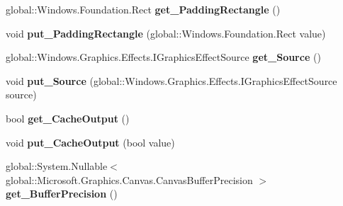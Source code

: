 \begin{DoxyCompactItemize}
global\+::\+Windows.\+Foundation.\+Rect {\bfseries get\+\_\+\+Padding\+Rectangle} ()
\item 
\mbox{\label{class_microsoft_1_1_graphics_1_1_canvas_1_1_effects_1_1_atlas_effect_ab39b71d277811975989494c96fa44eb8}} 
void {\bfseries put\+\_\+\+Padding\+Rectangle} (global\+::\+Windows.\+Foundation.\+Rect value)
\item 
\mbox{\label{class_microsoft_1_1_graphics_1_1_canvas_1_1_effects_1_1_atlas_effect_a137fc0dfdd8f3bd7fa836c902912ad7b}} 
global\+::\+Windows.\+Graphics.\+Effects.\+I\+Graphics\+Effect\+Source {\bfseries get\+\_\+\+Source} ()
\item 
\mbox{\label{class_microsoft_1_1_graphics_1_1_canvas_1_1_effects_1_1_atlas_effect_a5f26925a5df1c7cc2cebea7c7f995d8d}} 
void {\bfseries put\+\_\+\+Source} (global\+::\+Windows.\+Graphics.\+Effects.\+I\+Graphics\+Effect\+Source source)
\item 
\mbox{\label{class_microsoft_1_1_graphics_1_1_canvas_1_1_effects_1_1_atlas_effect_ae6ee5415891e9ad47abc270643df5d9c}} 
bool {\bfseries get\+\_\+\+Cache\+Output} ()
\item 
\mbox{\label{class_microsoft_1_1_graphics_1_1_canvas_1_1_effects_1_1_atlas_effect_a2ce99657e3acfc9ac4fe666ac5f45d3a}} 
void {\bfseries put\+\_\+\+Cache\+Output} (bool value)
\item 
\mbox{\label{class_microsoft_1_1_graphics_1_1_canvas_1_1_effects_1_1_atlas_effect_ac8d01d248d9d6d40669a53802cc60d4f}} 
global\+::\+System.\+Nullable$<$ global\+::\+Microsoft.\+Graphics.\+Canvas.\+Canvas\+Buffer\+Precision $>$ {\bfseries get\+\_\+\+Buffer\+Precision} ()
\item 
\mbox{\label{class_microsoft_1_1_graphics_1_1_canvas_1_1_effects_1_1_atlas_effect_a9e964ed03316816c532aba32ac6240f8}} 

\end{DoxyCompactItemize}
